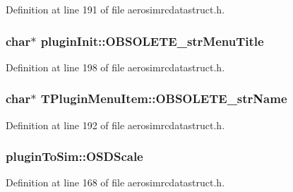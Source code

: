 Definition at line 191 of file aerosimrcdatastruct.\-h.

\hypertarget{group___aero_sim_r_c_ga03438bb42beb3367394a89c5f8b0d721}{
\subsubsection[{O\-B\-S\-O\-L\-E\-T\-E\-\_\-str\-Menu\-Title}]{\setlength{\rightskip}{0pt plus 5cm}char$\ast$ plugin\-Init\-::\-O\-B\-S\-O\-L\-E\-T\-E\-\_\-str\-Menu\-Title}}\label{group___aero_sim_r_c_ga03438bb42beb3367394a89c5f8b0d721}


Definition at line 198 of file aerosimrcdatastruct.\-h.

\hypertarget{group___aero_sim_r_c_ga99ed050ca0dfe8088a93046f72c044e7}{
\subsubsection[{O\-B\-S\-O\-L\-E\-T\-E\-\_\-str\-Name}]{\setlength{\rightskip}{0pt plus 5cm}char$\ast$ T\-Plugin\-Menu\-Item\-::\-O\-B\-S\-O\-L\-E\-T\-E\-\_\-str\-Name}}\label{group___aero_sim_r_c_ga99ed050ca0dfe8088a93046f72c044e7}


Definition at line 192 of file aerosimrcdatastruct.\-h.

\hypertarget{group___aero_sim_r_c_ga96db301b2cf97e19ccd774f1b93dad21}{
\subsubsection[{O\-S\-D\-Scale}]{ plugin\-To\-Sim\-::\-O\-S\-D\-Scale}}\label{group___aero_sim_r_c_ga96db301b2cf97e19ccd774f1b93dad21}


Definition at line 168 of file aerosimrcdatastruct.\-h.

